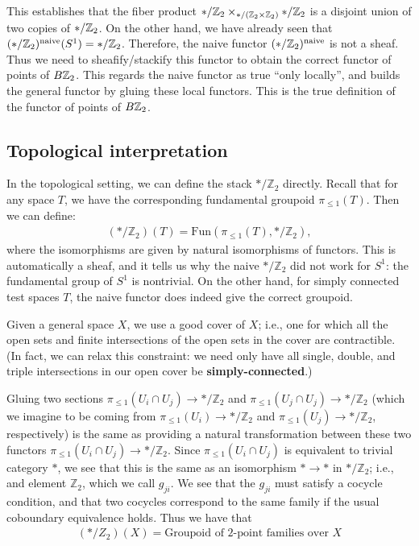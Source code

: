 \documentclass[12pt]{article}
\begin{document}
This establishes that the fiber product $*/\mathbb{Z}_2 \times_{*/(\mathbb{Z}_2 \times \mathbb{Z}_2)} */\mathbb{Z}_2$ is a disjoint union of two copies of $*/\mathbb{Z}_2$. On the other hand, we have already seen that $(*/\mathbb{Z}_2)^{\text{naive}}(S^1) = */\mathbb{Z}_2$. Therefore, the naive functor $(*/\mathbb{Z}_2)^{\text{naive}}$ is not a sheaf. Thus we need to sheafify/stackify this functor to obtain the correct functor of points of $B\mathbb{Z}_2$. This regards the naive functor as true “only locally”, and builds the general functor by gluing
these local functors. This is the true definition of the functor of points of $B\mathbb{Z}_2$.

\subsection{Topological interpretation}
In the topological setting, we can define the stack $*/\mathbb{Z}_2$ directly. Recall that for any
space $T$, we have the corresponding fundamental groupoid $\pi_{\leq 1}(T)$. Then we can define:
\begin{align}
    (*/\mathbb{Z}_2)(T) = \text{Fun}(\pi_{\leq 1}(T), */\mathbb{Z}_2),
\end{align}
where the isomorphisms are given by natural isomorphisms of functors. This is automatically
a sheaf, and it tells us why the naive $*/\mathbb{Z}_2$ did not work for $S^1$: the fundamental group of
$S^1$ is nontrivial. On the other hand, for simply connected test spaces $T$, the naive functor
does indeed give the correct groupoid.

Given a general space $X$, we use a good cover of $X$; i.e., one for which all
the open sets and finite intersections of the open sets in the cover are contractible. (In fact,
we can relax this constraint: we need only have all single, double, and triple intersections in
our open cover be \textbf{simply-connected}.)

Gluing two sections $\pi_{\leq 1}(U_i \cap U_j) \to */\mathbb{Z}_2$ and $\pi_{\leq 1}(U_j \cap U_j) \to */\mathbb{Z}_2$ (which we imagine to be coming from $\pi_{\leq 1}(U_i) \to */\mathbb{Z}_2$ and $\pi_{\leq 1}(U_j) \to */\mathbb{Z}_2$, respectively) is the same as providing a natural transformation between these two functors $\pi_{\leq 1}(U_i \cap U_j) \to */\mathbb{Z}_2$. Since $\pi_{\leq 1}(U_i \cap U_j)$ is equivalent to trivial category $*$, we see that this is the same as an isomorphism $* \to *$ in $*/\mathbb{Z}_2$; i.e., and element $\mathbb{Z}_2$, which we call $g_{ji}$. We see that the $g_{ji}$ must satisfy a cocycle condition, and that two cocycles correspond to the same family if the usual
coboundary equivalence holds. Thus we have that \begin{align*}
    (*/Z_2)(X) = \text{Groupoid of 2-point families over } X
\end{align*}
\end{document}
